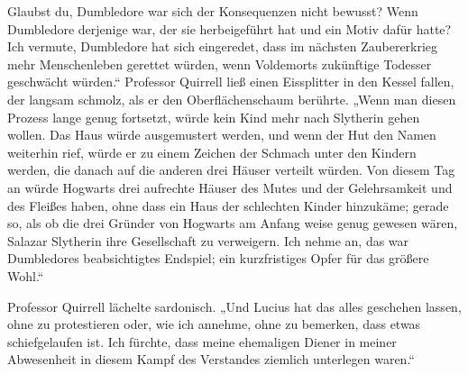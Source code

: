 Glaubst du, Dumbledore war sich der Konsequenzen nicht bewusst? Wenn Dumbledore derjenige war, der sie herbeigeführt hat und ein Motiv dafür hatte? Ich vermute, Dumbledore hat sich eingeredet, dass im nächsten Zaubererkrieg mehr Menschenleben gerettet würden, wenn Voldemorts zukünftige Todesser geschwächt würden.“
Professor Quirrell ließ einen Eissplitter in den Kessel fallen, der langsam schmolz, als er den Oberflächenschaum berührte.
„Wenn man diesen Prozess lange genug fortsetzt, würde kein Kind mehr nach Slytherin gehen wollen. Das Haus würde ausgemustert werden, und wenn der Hut den Namen weiterhin rief, würde er zu einem Zeichen der Schmach unter den Kindern werden, die danach auf die anderen drei Häuser verteilt würden. Von diesem Tag an würde Hogwarts drei aufrechte Häuser des Mutes und der Gelehrsamkeit und des Fleißes haben, ohne dass ein Haus der schlechten Kinder hinzukäme; gerade so, als ob die drei Gründer von Hogwarts am Anfang weise genug gewesen wären, Salazar Slytherin ihre Gesellschaft zu verweigern. Ich nehme an, das war Dumbledores beabsichtigtes Endspiel; ein kurzfristiges Opfer für das größere Wohl.“

Professor Quirrell lächelte sardonisch.
„Und Lucius hat das alles geschehen lassen, ohne zu protestieren oder, wie ich annehme, ohne zu bemerken, dass etwas schiefgelaufen ist. Ich fürchte, dass meine ehemaligen Diener in meiner Abwesenheit in diesem Kampf des Verstandes ziemlich unterlegen waren.“

